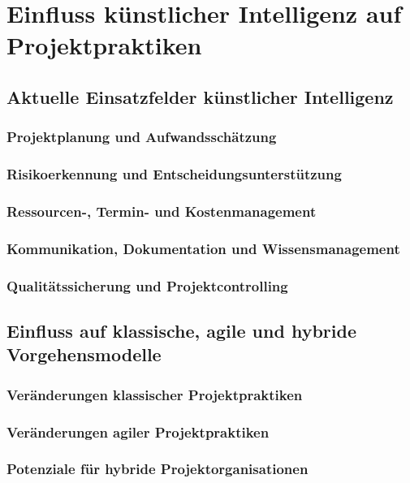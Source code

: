 \chapter{Einfluss künstlicher Intelligenz auf Projektpraktiken}
\label{sec:KIProjektpraktiken}

\section{Aktuelle Einsatzfelder künstlicher Intelligenz}
\label{sec:AktuelleKIEinsatzfelder}

\subsection{Projektplanung und Aufwandsschätzung}
\subsection{Risikoerkennung und Entscheidungsunterstützung}
\subsection{Ressourcen-, Termin- und Kostenmanagement}
\subsection{Kommunikation, Dokumentation und Wissensmanagement}
\subsection{Qualitätssicherung und Projektcontrolling}

\section{Einfluss auf klassische, agile und hybride Vorgehensmodelle}
\label{sec:KIEinflussVorgehensmodelle}

\subsection{Veränderungen klassischer Projektpraktiken}
\subsection{Veränderungen agiler Projektpraktiken}
\subsection{Potenziale für hybride Projektorganisationen}

